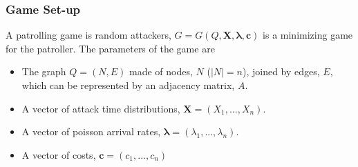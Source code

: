 \documentclass[a4paper,10pt]{article}
\theoremstyle{definition}
\theoremstyle{definition}
\theoremstyle{remark}
\theoremstyle{definition}
\begin{document}
\subsubsection{Game Set-up}
A patrolling game is random attackers, $G=G(Q,\bm{X},\bm{\lambda},\bm{c})$ is a minimizing game for the patroller. The parameters of the game are

\begin{itemize}
\item The graph $Q=(N,E)$ made of nodes, $N$ ($|N|=n$), joined by edges, $E$, which can be represented by an adjacency matrix, $A$.
\item A vector of attack time distributions, $\bm{X}=(X_{1},...,X_{n})$.
\item A vector of poisson arrival rates, $\bm{\lambda}=(\lambda_{1},...,\lambda_{n})$.
\item A vector of costs, $\bm{c}=(c_{1},...,c_{n})$
\end{itemize}
\end{document}
